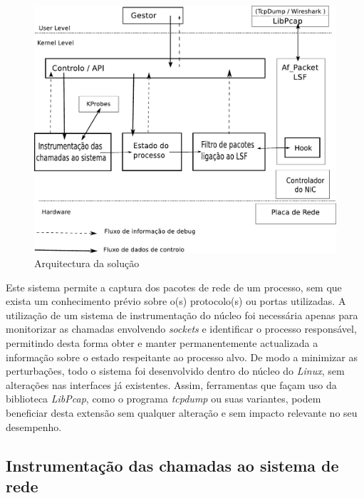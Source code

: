 \documentclass[a4paper]{llncs}
\begin{document}
\begin{figure}[htbp]
\begin{center}
\includegraphics[scale=0.5]{interface.pdf} 
\caption{Arquitectura da solução}
\label{arquitectura}
\end{center}
\end{figure}


Este sistema permite a captura dos pacotes de rede de um processo, sem que exista um conhecimento prévio sobre o(s) protocolo(s) ou portas utilizadas.
 A utilização de um sistema de instrumentação do núcleo foi necessária apenas para monitorizar as chamadas envolvendo \emph{sockets} e identificar o processo responsável, permitindo desta forma obter e manter permanentemente actualizada a informação sobre o estado respeitante ao processo alvo.
 De modo a minimizar as perturbações, todo o sistema foi desenvolvido dentro do núcleo do \textit{Linux}, sem alterações nas interfaces já existentes.
 Assim, ferramentas que façam uso da biblioteca \textit{LibPcap}, como o programa \textit{tcpdump} ou suas variantes, podem beneficiar desta extensão sem qualquer alteração e sem impacto relevante no seu desempenho.



\subsection*{Instrumentação das chamadas ao sistema de rede}
\label{sub:mon_syscalls}
\end{document}
